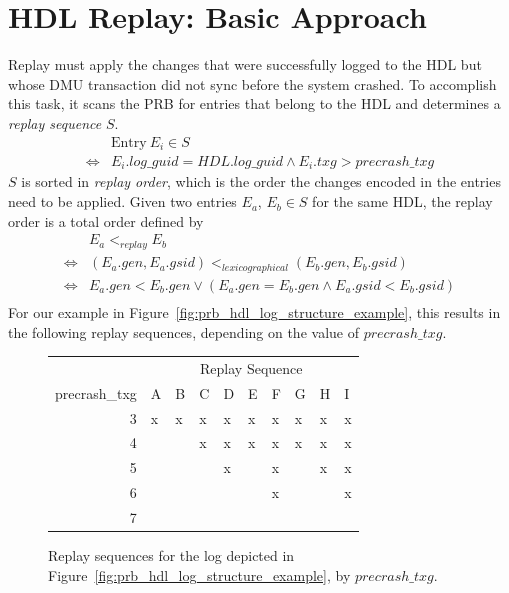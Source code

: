 \documentclass[12pt,a4paper,twoside]{book}
\begin{document}
\section{HDL Replay: Basic Approach}\label{di:prb:replayapproach}
Replay must apply the changes that were successfully logged to the HDL but whose DMU transaction did not sync before the system crashed.
To accomplish this task, it scans the PRB for entries that belong to the HDL and determines a \textit{replay sequence} $S$.
\begin{align*}
    & \text{Entry}~E_i \in S \\
    \Leftrightarrow & E_i.log\_guid = HDL.log\_guid \wedge E_i.txg > precrash\_txg
\end{align*}
$S$ is sorted in \textit{replay order}, which is the order the changes encoded in the entries need to be applied.
Given two entries $E_a$, $E_b \in S$ for the same HDL, the replay order is a total order defined by
\begin{align*}
    & E_a <_{replay} E_b \\
    \Leftrightarrow &  (E_a.gen, E_a.gsid) <_{lexicographical} (E_b.gen, E_b.gsid) \\
    \Leftrightarrow & E_a.gen < E_b.gen \vee (E_a.gen = E_b.gen \wedge E_a.gsid < E_b.gsid) \\
\end{align*}
For our example in Figure~\ref{fig:prb_hdl_log_structure_example}, this results in the following replay sequences, depending on the value of $precrash\_txg$.


\begin{figure}[H]
    \centering
        \begin{tabular}{r|l|l|l|l|l|l|l|l|l|}
        \multicolumn{1}{l|}{}              & \multicolumn{9}{c|}{Replay Sequence} \\
        \multicolumn{1}{c|}{precrash\_txg} & A  & B  & C  & D & E & F & G & H & I \\ \hline
        3                                  & x  & x  & x  & x & x & x & x & x & x \\
        4                                  &    &    & x  & x & x & x & x & x & x \\
        5                                  &    &    &    & x &   & x &   & x & x \\
        6                                  &    &    &    &   &   & x &   &   & x \\
        7                                  &    &    &    &   &   &   &   &   &   \\ \cline{2-10} 
    \end{tabular}
    \caption{Replay sequences for the log depicted in Figure~\ref{fig:prb_hdl_log_structure_example}, by $precrash\_txg$. }
    \label{fig:prb_hdl_log_structure_example__replay}
\end{figure}
\end{document}
